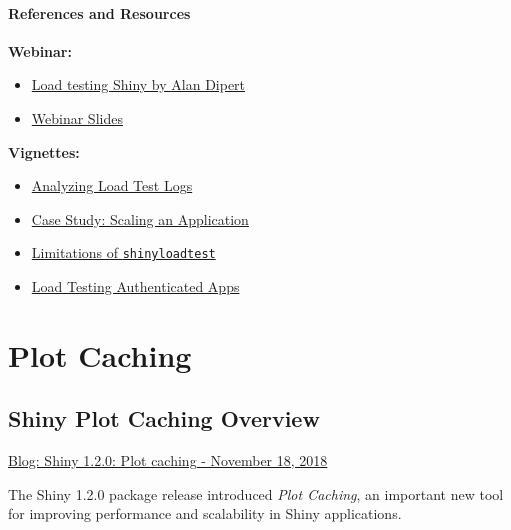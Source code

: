 \documentclass[]{book}
\providecommand{\tightlist}{%
  \setlength{\itemsep}{0pt}\setlength{\parskip}{0pt}}
\theoremstyle{definition}
\theoremstyle{definition}
\theoremstyle{definition}
\theoremstyle{remark}
\begin{document}
\hypertarget{references-and-resources-1}{%
\subsubsection{References and
Resources}\label{references-and-resources-1}}

\textbf{Webinar:}

\begin{itemize}
\tightlist
\item
  \href{https://resources.rstudio.com/webinars/load-testing-shiny-alan-dipert}{Load
  testing Shiny by Alan Dipert}
\item
  \href{https://github.com/rstudio/webinars/blob/master/63-shinyloadtest/slides.pdf}{Webinar
  Slides}
\end{itemize}

\textbf{Vignettes:}

\begin{itemize}
\tightlist
\item
  \href{https://rstudio.github.io/shinyloadtest/articles/analyzing-load-test-logs.html}{Analyzing
  Load Test Logs}
\item
  \href{https://rstudio.github.io/shinyloadtest/articles/case-study-scaling.html}{Case
  Study: Scaling an Application}
\item
  \href{https://rstudio.github.io/shinyloadtest/articles/limitations-of-shinyloadtest.html}{Limitations
  of \texttt{shinyloadtest}}
\item
  \href{https://rstudio.github.io/shinyloadtest/articles/load-testing-authenticated-apps.html}{Load
  Testing Authenticated Apps}
\end{itemize}

\hypertarget{plot-caching}{%
\chapter{Plot Caching}\label{plot-caching}}

\hypertarget{shiny-plot-caching-overview}{%
\section{Shiny Plot Caching
Overview}\label{shiny-plot-caching-overview}}

\href{https://resources.rstudio.com/rstudio-blog/shiny-1-2-0-plot-caching}{Blog:
Shiny 1.2.0: Plot caching - November 18, 2018}

The Shiny 1.2.0 package release introduced \emph{Plot Caching}, an
important new tool for improving performance and scalability in Shiny
applications.
\end{document}
